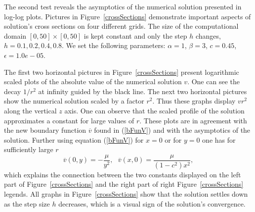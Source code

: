 \documentclass[preprint]{elsarticle}
\newcommand{\rf}[1]{(\ref{#1})}
\def\bar#1{{\overline{#1}}}
\begin{document}
The second test reveals the asymptotics of the numerical solution presented in log-log plots. 
 Pictures in Figure~\ref{crossSections} demonstrate important aspects of solution's cross sections on four different grids. The size of the computational domain $[0,50]\times [0,50]$ is kept constant and only the step $h$ changes,
$h = 0.1, 0.2, 0.4, 0.8$. We set the following parameters:  $\alpha = 1$, $\beta = 3$, $c = 0.45$, $\epsilon = 1.0e-05$.

 The first two horizontal pictures in Figure~\ref{crossSections} present logarithmic scaled plots of the absolute value of the numerical solution $v$. One can see the 
 decay $1/r^2$ at infinity guided by the black line. The next two horizontal pictures show the numerical solution scaled by a factor $r^2$. Thus these graphs display $v r^2$ along the vertical $z$ axis. One can observe that the scaled profile of the solution approximates a constant for large values of $r$. 
These plots are in  agreement with the new boundary function $\bar{v}$ found in \rf{bFunV} and with the asymptotics  of the solution. 
 Further using equation \rf{bFunV} for $x=0$ or for  $y=0$ one has for sufficiently large $r$ 
\begin{equation*}
\bar{v}(0,y) = -\frac {\mu} {y^2}, \ \ \  \bar{v}(x,0) =\frac {\mu} {(1-c^2)x^2},  
\end{equation*}
which explains the connection between the two constants displayed on the left part of Figure~\ref{crossSections} and the right part of right Figure~\ref{crossSections} legends.
All graphs in Figure~\ref{crossSections} show that the solution settles down as the step size $h$ decreases, which is a visual sign of the solution's convergence.
\end{document}
